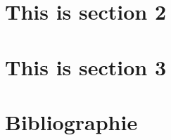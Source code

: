\documentclass[12pt, a4paper, ngerman, bidi=default]{article}
\begin{document}
\section{This is section 2}


\section{This is section 3}

\section{Bibliographie}

\newpage{}
\end{document}
